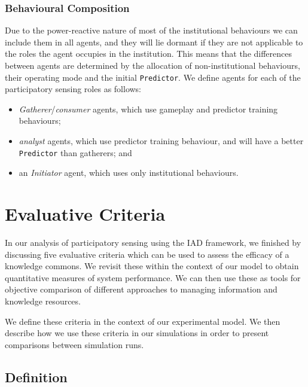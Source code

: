 
\subsubsection*{Behavioural Composition}

Due to the power-reactive nature of most of the institutional behaviours we
can include them in all agents, and they will lie dormant if they are not
applicable to the roles the agent occupies in the institution. This means that
the differences between agents are determined by the allocation of 
non-institutional behaviours, their operating mode and the initial
\texttt{Predictor}. We define agents for each of the participatory sensing
roles as follows:

\begin{itemize}
\item \emph{Gatherer}/\emph{consumer} agents, which use gameplay and predictor training behaviours;
\item \emph{analyst} agents, which use predictor training behaviour, and will have a better \texttt{Predictor} than gatherers; and
\item an \emph{Initiator} agent, which uses only institutional behaviours.
\end{itemize}

\section{Evaluative Criteria}

In our analysis of participatory sensing using the \ac{IAD} framework, we finished by
discussing five evaluative criteria which can be used to assess the efficacy
of a knowledge commons. We revisit these within the context of our model to
obtain quantitative measures of system performance. We can then use these as
tools for objective comparison of different approaches to managing
information and knowledge resources.

We define these criteria in the context of our experimental model. We then
describe how we use these criteria in our simulations in order to present
comparisons between simulation runs.

\subsection{Definition}

